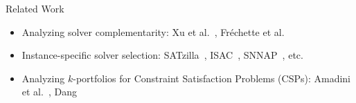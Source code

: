 \documentclass[en]{sdqbeamer}
\begin{document}
\begin{frame}[t]{Related Work}
	\begin{itemize}
		\item Analyzing solver complementarity: Xu et al.~\cite{Xu:2012:EvalContribVBS}, Fr{\'e}chette et al.~\cite{frechette2016using}
		\pause
		\vspace{\baselineskip}
		\item Instance-specific solver selection: SATzilla~\cite{xu2008satzilla, xu2012satzilla2012}, ISAC~\cite{Kadioglu:2010:ISAC}, SNNAP~\cite{Collautti:2013:SNNAP}, etc.
		\pause
		\vspace{\baselineskip}
		\item Analyzing $k$-portfolios for Constraint Satisfaction Problems (CSPs): Amadini et al.~\cite{amadini2014empirical, amadini2016extensive}, Dang~\cite{dang2022portfolio}

\end{itemize}
\end{frame}
\end{document}
